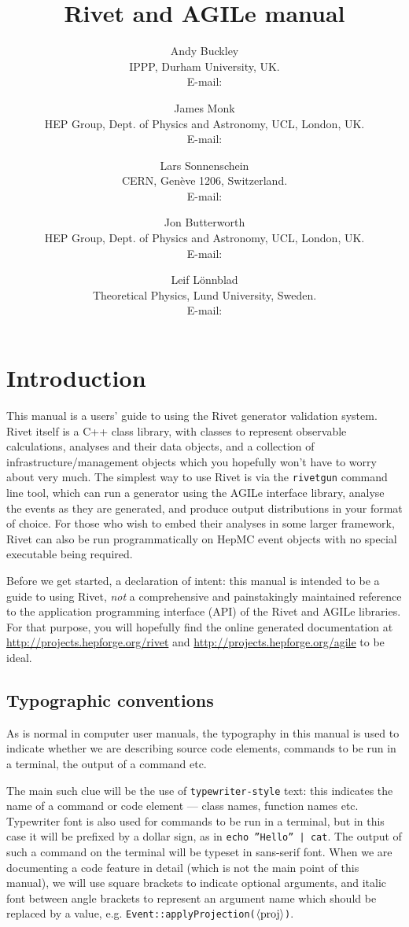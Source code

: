 \documentclass{JHEP3}
\title{Rivet and AGILe manual}
\author{Andy Buckley\\ IPPP, Durham University, UK.\\ E-mail: \email{andy.buckley@durham.ac.uk}}
\author{James Monk\\ HEP Group, Dept. of Physics and Astronomy, UCL, London, UK.\\ E-mail: \email{jmonk@fnal.gov}}
\author{Lars Sonnenschein\\ CERN, Gen\`eve 1206, Switzerland.\\ E-mail: \email{sonne@cern.ch}}
\author{Jon Butterworth\\ HEP Group, Dept. of Physics and Astronomy, UCL, London, UK.\\ E-mail: \email{jmb@hep.ucl.ac.uk}}
\author{Leif L\"onnblad\\ Theoretical Physics, Lund University, Sweden.\\ E-mail: \email{lonnblad@thep.lu.se}}
\newcommand{\kbd}[1]{\texttt{#1}\xspace}
\newcommand{\inp}[1]{\textsf{\textdollar}\hspace{1mm}\texttt{#1}\xspace}
\newcommand{\outp}[1]{\textsf{#1}\xspace}
\newcommand{\code}[1]{\texttt{#1}\xspace}
\newcommand{\val}[1]{\textit{\ensuremath{\langle\text{\textrm{#1}\/}\rangle}}\xspace}
\begin{document}
 


\section{Introduction}
This manual is a users' guide to using the Rivet generator validation
system. Rivet itself is a C++ class library, with classes to represent
observable calculations, analyses and their data objects, and a collection of
infrastructure/management objects which you hopefully won't have to worry about
very much. The simplest way to use Rivet is via the \kbd{rivetgun} command line
tool, which can run a generator using the AGILe interface library, analyse the
events as they are generated, and produce output distributions in your format of
choice. For those who wish to embed their analyses in some larger framework,
Rivet can also be run programmatically on HepMC event objects with no special
executable being required.

Before we get started, a declaration of intent: this manual is intended to be a
guide to using Rivet, \emph{not} a comprehensive and painstakingly maintained
reference to the application programming interface (API) of the Rivet and AGILe
libraries. For that purpose, you will hopefully find the online generated
documentation at \url{http://projects.hepforge.org/rivet} and
\url{http://projects.hepforge.org/agile} to be ideal.

\subsection{Typographic conventions}
As is normal in computer user manuals, the typography in this manual is used to
indicate whether we are describing source code elements, commands to be run in a
terminal, the output of a command etc.

The main such clue will be the use of \kbd{typewriter-style} text: this
indicates the name of a command or code element --- class names, function names
etc. Typewriter font is also used for commands to be run in a terminal, but in
this case it will be prefixed by a dollar sign, as in \inp{echo ''Hello'' |
  cat}.  The output of such a command on the terminal will be typeset in
\outp{sans-serif} font. When we are documenting a code feature in detail (which
is not the main point of this manual), we will use square brackets to indicate
optional arguments, and italic font between angle brackets to represent an
argument name which should be replaced by a value,
e.g. \code{Event::applyProjection(\val{proj})}.
\end{document}
